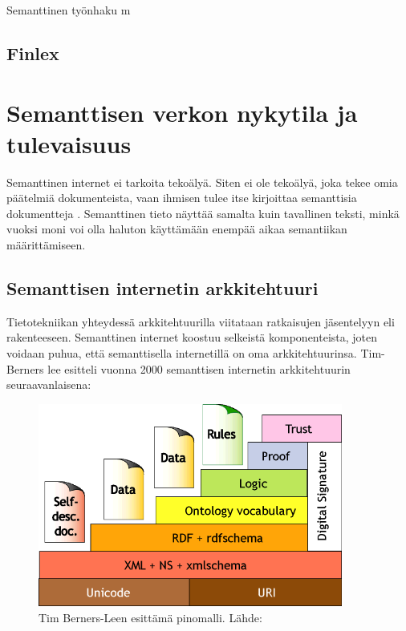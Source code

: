 \documentclass[finnish, 12pt, a4paper, elec, utf8, pdfa, online]{aaltothesis}
\begin{document}
Semanttinen työnhaku m


\subsection{Finlex}

\clearpage
\section{Semanttisen verkon nykytila ja tulevaisuus}



Semanttinen internet ei tarkoita tekoälyä. Siten ei ole tekoälyä, joka tekee omia päätelmiä dokumenteista, vaan ihmisen tulee itse kirjoittaa semanttisia dokumentteja \cite{Semantic_Web_represent}. Semanttinen tieto näyttää samalta kuin tavallinen teksti, minkä vuoksi moni voi olla haluton käyttämään enempää aikaa semantiikan määrittämiseen.

\subsection{Semanttisen internetin arkkitehtuuri}
Tietotekniikan yhteydessä arkkitehtuurilla viitataan ratkaisujen jäsentelyyn eli rakenteeseen. Semanttinen internet koostuu selkeistä komponenteista, joten voidaan puhua, että semanttisella internetillä on oma arkkitehtuurinsa. Tim-Berners lee esitteli vuonna 2000 semanttisen internetin arkkitehtuurin seuraavanlaisena:

\begin{figure}[htb]
\centering
\includegraphics[width=10cm]{images/sweb-stack.png}
\caption{Tim Berners-Leen esittämä pinomalli. Lähde: \cite{stack_bl} \label{images/sweb-stack.png}}
\end{figure}
\clearpage %
\end{document}
